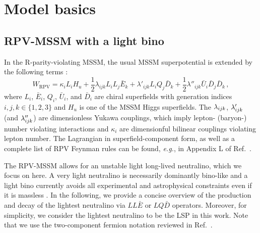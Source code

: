 \section{Model basics}\label{sec:model}
\subsection{RPV-MSSM with a light bino}
In the R-parity-violating MSSM, the usual MSSM superpotential is extended by the following terms
\cite{Hall:1983id, Allanach:2003eb}:
\begin{equation}
    W_\text{RPV} = \kappa_i L_i H_u + \frac{1}{2} \lambda_{ijk} L_i L_j \bar{E}_k + \lambda'_{ijk} L_i Q_j \bar{D}_k + \frac{1}{2} \lambda''_{ijk} \bar{U}_i \bar{D}_j \bar{D}_k \, ,
    \label{eq:W_RPV}
\end{equation}
where $L_i$, $\bar E_i$, $Q_i$, $\bar U_i$, and $\bar D_i$ are chiral superfields with generation indices $i,j,k \in 
\{1,2,3\}$ and $H_u$ is one of the MSSM Higgs superfields. The $\lambda_{ijk}$, $\lambda'_{ijk}$ (and $\lambda''_{ijk}$) are 
dimensionless Yukawa couplings, which imply lepton- (baryon-) number violating interactions and $\kappa_i$ are 
dimensionful bilinear couplings violating lepton number.
The Lagrangian in superfield-component form, as well as a complete list 
of RPV Feynman rules can be found, \textit{e.g.}, in Appendix L of Ref.~\cite{Dreiner:2008tw}. 

The RPV-MSSM allows for an unstable light long-lived neutralino, which we focus on here. A very light neutralino 
is necessarily dominantly bino-like \cite{Choudhury:1999tn} and a light bino currently avoids all experimental
and astrophysical constraints even if it is massless \cite{Gogoladze:2002xp, Dreiner:2003wh, Dreiner:2011fp}. In the 
following, we provide a concise overview of the production and decay of the lightest neutralino via $LL\bar E$ or 
$LQ\bar D$ operators. Moreover, for simplicity, we consider the lightest neutralino to be the LSP in this work. Note 
that we use the two-component fermion notation reviewed in Ref.~\cite{Dreiner:2008tw}.


